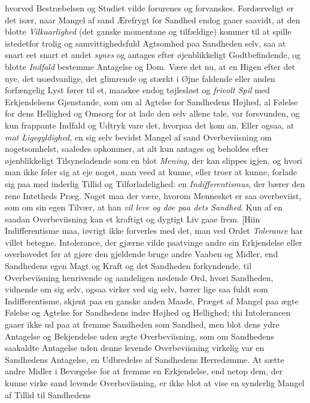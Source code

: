\documentclass[12pt,a4paper]{book}
\newcommand{\apage}[1]{\marginnote{\footnotesize\textit{[#1]}}}
\begin{document}
hvorved Bestræbelsen og Studiet vilde forurenes og forvanskes. Fordærveligt er det
især, naar Mangel af sand Ærefrygt for Sandhed endog gaaer saavidt, at den blotte
\emph{Vilkaarlighed} (det ganske momentane og tilfældige) kommer til at spille
istedetfor trolig og samvittighedsfuld Agtsomhed paa Sandheden selv, saa at snart
eet snart et andet \emph{synes} og antages efter øjenblikkeligt Godtbefindende, og blotte
\emph{Indfald} bestemme Antagelse og Dom. Være det nu, at en Higen efter det nye, det
usædvanlige, det glimrende og stærkt i Øjne faldende eller anden forfængelig Lyst
fører til et, maaskee endog tøjlesløst og \emph{frivolt Spil} med Erkjendelsens
Gjenstande, som om al Agtelse for Sandhedens Højhed, al Følelse for dens Hellighed
og Omsorg for at lade den selv allene tale, var forsvunden, og kun frappante
Indfald og Udtryk vare det, hvorpaa det kom an. Eller ogsaa, at \emph{mat Ligegyldighed},
en sig selv bevidst  \apage{178} Mangel af sand Overbeviisning om nogetsomhelst, saaledes
opkommer, at alt kun antages og beholdes efter øjenblikkeligt Tilsyneladende som
en blot \emph{Mening}, der kan slippes igjen, og hvori man ikke føler sig at eje noget,
man veed at kunne, eller troer at kunne, forlade sig paa med inderlig Tillid og
Tilforladelighed: en \emph{Indifferentismus}, der bærer den rene Intetheds Præg.
Noget maa der være, hvorom Mennesket er saa overbeviist, som om sin egen Tilvær, at
han \emph{vil leve og døe paa dets Sandhed}. Kun af en saadan Overbeviisning kan et
kraftigt og dygtigt Liv gaae frem. [Hiin Indifferentisme maa, iøvrigt ikke
forverles med det, man ved Ordet \emph{Tolerance} har villet betegne.
Intolerance, der gjærne vilde paatvinge andre sin Erkjendelse eller
overhovedet før at gjøre den gjeldende bruge andre Vaaben og Midler, end Sandhedens
egen Magt og Kraft og det Sandheden forkyndende, til Overbeviisning henrivende og
aandeligen nødende Ord, hvori Sandheden, vidnende om sig selv, ogsaa virker ved
sig selv, bærer lige saa fuldt som Indifferentisme, skjønt paa en ganske anden
Maade, Præget af Mangel paa ægte Følelse og Agtelse for Sandhedens indre Højhed og
Hellighed; thi Intolerancen gaaer ikke ud paa at fremme Sandheden som Sandhed, men
blot dens ydre Antagelse og Bekjendelse uden ægte Overbeviisning, som om Sandhedens
saakaldte \apage{179} Antagelse uden denne levende Overbeviisning virkelig var en Sandhedens
Antagelse, en Udbredelse af Sandhedens Herredømme. At sætte andre Midler i
Bevægelse for at fremme en Erkjendelse, end netop dem, der kunne virke sand levende
Overbeviisning, er ikke blot at vise en synderlig Mangel af Tillid til Sandhedens
\end{document}
